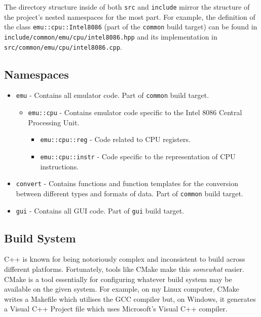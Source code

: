     The directory structure inside of both \texttt{src} and \texttt{include} mirror the structure of the project's nested namespaces for the most part. For example, the definition of the class \texttt{emu::cpu::Intel8086} (part of the \texttt{common} build target) can be found in \texttt{include/common/emu/cpu/intel8086.hpp} and its implementation in \texttt{src/common/emu/cpu/intel8086.cpp}.

\subsection{Namespaces}
    \begin{itemize}
        \item \texttt{emu} - Contains all emulator code. Part of \texttt{common} build target.
        \begin{itemize}
            \item \texttt{emu::cpu} - Contains emulator code specific to the Intel 8086 Central Processing Unit.
            \begin{itemize}
                \item \texttt{emu::cpu::reg} - Code related to CPU registers.
                \item \texttt{emu::cpu::instr} - Code specific to the representation of CPU instructions.
            \end{itemize}
        \end{itemize}
        \item \texttt{convert} - Contains functions and function templates for the conversion between different types and formats of data. Part of \texttt{common} build target.
        \item \texttt{gui} - Contains all GUI code. Part of \texttt{gui} build target.
    \end{itemize}


\subsection{Build System}
    C++ is known for being notoriously complex and inconsistent to build across different platforms. Fortunately, tools like CMake make this \textit{somewhat} easier. CMake is a tool essentially for configuring whatever build system may be available on the given system. For example, on my Linux computer, CMake writes a Makefile which utilises the GCC compiler but, on Windows, it generates a Visual C++ Project file which uses Microsoft's Visual C++ compiler.

